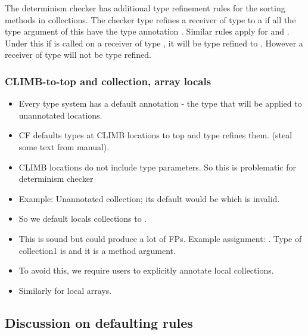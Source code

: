 The determinism checker has additional type refinement rules for the sorting methods in collections. 
The checker type refines a receiver of type  to a  if all the
type argument of this  have the type annotation . Similar rules apply for  and
.
Under this if  is called on a receiver of type , it will
be type refined to . However a receiver of type  will not be type refined.

\subsubsection{CLIMB-to-top and collection, array locals}

\begin{itemize}
	\item Every type system has a default annotation - the type that will be applied to unannotated locations.
	\item CF defaults types at CLIMB locations to top and type refines them. (steal some text from manual).
	\item CLIMB locations do not include type parameters. So this is problematic for determinism checker
	\item Example: Unannotated collection; its default would be  which is invalid.
	\item So we default locals collections to . 
	\item This is sound but could produce a lot of FPs. Example assignment: .
	Type of collection1 is  and it is a method argument.
	\item To avoid this, we require users to explicitly annotate local collections.
	\item Similarly for local arrays.
\end{itemize}

\subsection{Discussion on defaulting rules}

